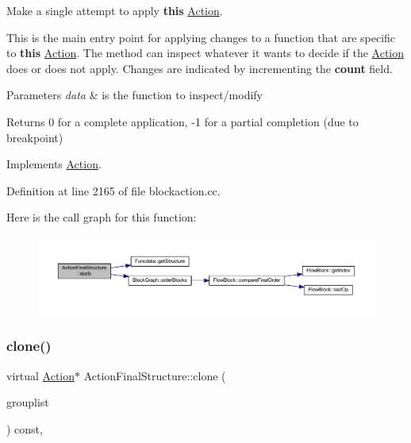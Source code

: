 Make a single attempt to apply {\bfseries{this}} \mbox{\hyperlink{class_action}{Action}}. 

This is the main entry point for applying changes to a function that are specific to {\bfseries{this}} \mbox{\hyperlink{class_action}{Action}}. The method can inspect whatever it wants to decide if the \mbox{\hyperlink{class_action}{Action}} does or does not apply. Changes are indicated by incrementing the {\bfseries{count}} field. 
\begin{DoxyParams}{Parameters}
{\em data} & is the function to inspect/modify \\
\hline
\end{DoxyParams}
\begin{DoxyReturn}{Returns}
0 for a complete application, -\/1 for a partial completion (due to breakpoint) 
\end{DoxyReturn}


Implements \mbox{\hyperlink{class_action_aac1c3999d6c685b15f5d9765a4d04173}{Action}}.



Definition at line 2165 of file blockaction.\+cc.

Here is the call graph for this function\+:
\nopagebreak
\begin{figure}[H]
\begin{center}
\leavevmode
\includegraphics[width=350pt]{class_action_final_structure_a872ef94df66c1fb7acd17022b739bac2_cgraph}
\end{center}
\end{figure}
\mbox{\label{class_action_final_structure_a2e9f507eb58ffe2c4c7de862eebcb92f}} 
\subsubsection{\texorpdfstring{clone()}{clone()}}
{\footnotesize\ttfamily virtual \mbox{\hyperlink{class_action}{Action}}$\ast$ Action\+Final\+Structure\+::clone (\begin{DoxyParamCaption}\item[{const \mbox{\hyperlink{class_action_group_list}{Action\+Group\+List}} \&}]{grouplist }\end{DoxyParamCaption}) const\hspace{0.3cm}{\ttfamily [inline]}, {\ttfamily [virtual]}}



